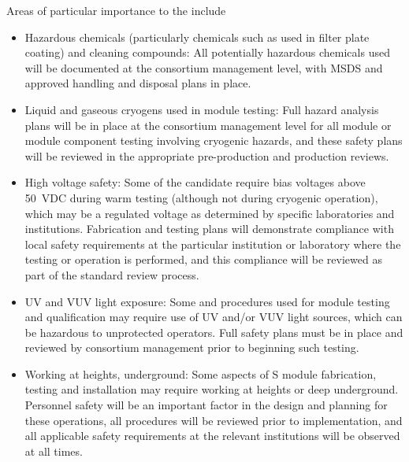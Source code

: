 Areas of particular importance to the  include
\begin{itemize}
\item Hazardous chemicals (particularly  chemicals such as  used in filter plate coating) and cleaning compounds:  All potentially hazardous chemicals used will be documented at the consortium management level, with MSDS and approved handling and disposal plans in place.

\item Liquid and gaseous cryogens used in module testing:  Full hazard analysis plans will be in place at the consortium management level for all module or module component testing involving cryogenic hazards, and these safety plans will be reviewed in the appropriate pre-production and production reviews.

\item High voltage safety:  Some of the candidate  require bias voltages above \SI{50}{VDC} during warm testing (although not during cryogenic operation), which may be a regulated voltage as determined by specific laboratories and institutions.  Fabrication and testing plans will demonstrate compliance with local  safety requirements at the particular institution or laboratory where the testing or operation is performed, and this compliance will be reviewed as part of the standard review process.

\item UV and VUV light exposure:  Some  and  procedures used for module testing and qualification may require use of UV and/or VUV light sources, which can be hazardous  to unprotected operators.  Full safety plans must be in place and reviewed by consortium management prior to beginning such testing.

\item Working at heights, underground:  Some aspects of S module fabrication, testing and installation may require working at heights or deep underground. Personnel safety will be an important factor in the design and planning for these operations, all procedures will be reviewed prior to implementation, and all applicable safety requirements at the relevant institutions will be observed at all times.
%

\end{itemize}
